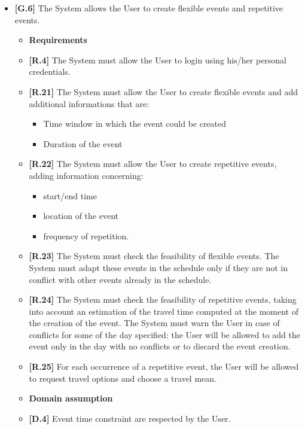 \begin{itemize}
	\item \textbf{[G.6]} The System allows the User to create flexible events and repetitive events.
	\begin{itemize}
		\item [] \textbf{Requirements}
		\item \textbf{[R.4]} The System must allow the User to login using his/her personal credentials.
		\item \textbf{[R.21]} The System must allow the User to create flexible events and add additional informations that are:
		\begin{itemize}
			\item Time window in which the event could be created
			\item Duration of the event
		\end{itemize}
		\item \textbf{[R.22]} The System must allow the User to create repetitive events, adding information concerning:
		\begin{itemize}
			\item start/end time
			\item location of the event
			\item frequency of repetition.
		\end{itemize}
		\item \textbf{[R.23]} The System must check the feasibility of flexible events. The System must adapt these events in the schedule only if they are not in conflict with other events already in the schedule. 
		\item \textbf{[R.24]} The System must check the feasibility of repetitive events, taking into account an estimation of the travel time computed at the moment of the creation of the event.
		The System must warn the User in case of conflicts for some of the day specified: the User will be allowed to add the event only in the day with no conflicts or to discard the event creation.
		\item \textbf{[R.25]} For each occurrence of a repetitive event, the User will be allowed to request travel options and choose a travel mean.
		\item [] \textbf{Domain assumption}
		\item\textbf{[D.4]} Event time constraint are respected by the User.
	\end{itemize}


\end{itemize}
